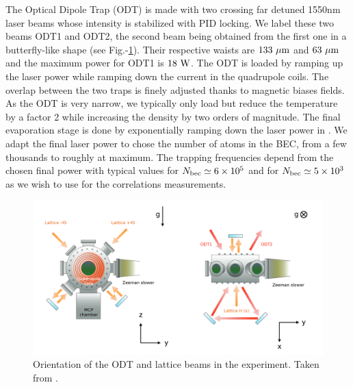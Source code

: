 The Optical Dipole Trap (ODT) is made with two crossing far detuned 1550nm laser beams whose intensity is stabilized with PID locking. We label these two beams ODT1 and ODT2, the second beam being obtained from the first one in a butterfly-like shape (see Fig.-\ref{fig:scheme_odt_lattice}). Their respective waists are $133 \ \mu \rm{m}$ and $63 \ \mu \rm{m}$ and the maximum power for ODT1 is $18 \ \rm{W}$. The ODT is loaded by ramping up the laser power while ramping down the current in the quadrupole coils. The overlap between the two traps is finely adjusted thanks to magnetic biases fields. As the ODT is very narrow, we typically only load  but reduce the temperature by a factor 2 while increasing the density by two orders of magnitude. The final evaporation stage is done by exponentially ramping down the laser power in . We adapt the final laser power to chose the number of atoms in the BEC, from a few thousands to roughly  at maximum. The trapping frequencies depend from the chosen final power with typical values  for $N_{\rm{bec}} \simeq 6 \times 10^5$ and  for $N_{\rm{bec}} \simeq 5 \times 10^3$ as we wish to use for the \kmk correlations measurements.


\begin{figure}
    \centering
    \includegraphics[width=\textwidth]{Fig/Chapter3/scheme_odt_lattice.png}
    \caption[Orientation of the ODT and lattice beams in the experiment]{Orientation of the ODT and lattice beams in the experiment. Taken from \cite{cayla_these}.}
    \label{fig:scheme_odt_lattice}
\end{figure}

